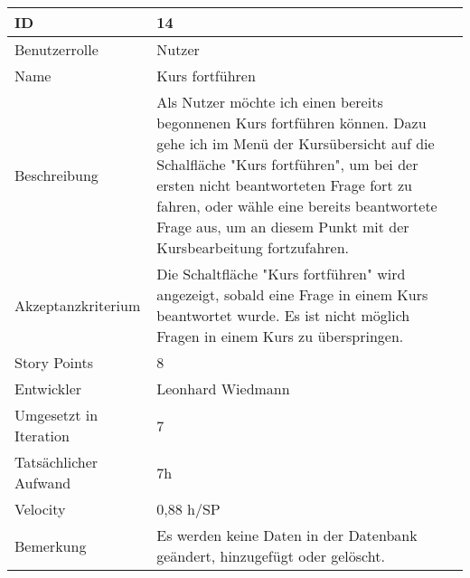 \begin{tabularx}{\textwidth}{|p{}|X|}
	\hline
	ID & 14 \\
	\hline
	Benutzerrolle & Nutzer\\
	\hline
	Name & Kurs fortführen\\
	\hline
	Beschreibung & Als Nutzer möchte ich einen bereits begonnenen Kurs fortführen können. Dazu gehe ich im Menü der Kursübersicht auf die Schalfläche "Kurs fortführen", um bei der ersten nicht beantworteten Frage fort zu fahren, oder wähle eine bereits beantwortete Frage aus, um an diesem Punkt mit der Kursbearbeitung fortzufahren. \\
	\hline
	Akzeptanzkriterium & Die Schaltfläche "Kurs fortführen" wird angezeigt, sobald eine Frage in einem Kurs beantwortet wurde. Es ist nicht möglich Fragen in einem Kurs zu überspringen.\\
	\hline
	Story Points & 8\\
	\hline
	Entwickler & Leonhard Wiedmann\\
	\hline
	Umgesetzt in Iteration & 7 \\
	\hline
	Tatsächlicher Aufwand & 7h \\
	\hline
	Velocity & 0,88 h/SP \\
	\hline
	Bemerkung & Es werden keine Daten in der Datenbank geändert, hinzugefügt oder gelöscht.\\
	\hline
\end{tabularx}
\vspace{20pt}
